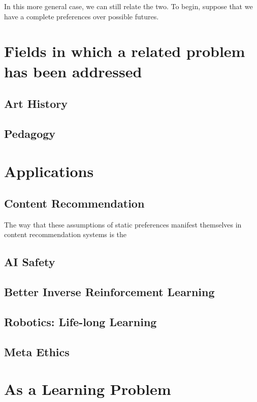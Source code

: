 \documentclass{book}
\begin{document}
	In this more general case, we can still relate the two. To begin, suppose that we have a complete preferences over possible futures. 
	
	
	\section{Fields in which a related problem has been addressed}
	
	\subsection{Art History} %
	\subsection{Pedagogy} %
	\subsection{}
	
	
	\section{Applications}
	
	\subsection{Content Recommendation}
	The way that these assumptions of static preferences manifest themselves in content recommendation systems is the
	
	\subsection{AI Safety}
	\subsection{Better Inverse Reinforcement Learning}
	\subsection{Robotics: Life-long Learning}
	\subsection{Meta Ethics}
	
	\section{As a Learning Problem}
	
	
\end{document}
